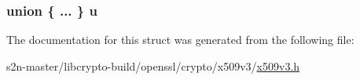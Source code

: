 \subsubsection[{\texorpdfstring{u}{u}}]{\setlength{\rightskip}{0pt plus 5cm}union \{ ... \}   u}\hypertarget{struct_a_s_id_or_range__st_a0f87daae8639568e823097ee78b6a9dc}{}\label{struct_a_s_id_or_range__st_a0f87daae8639568e823097ee78b6a9dc}


The documentation for this struct was generated from the following file\+:\begin{DoxyCompactItemize}
\item 
s2n-\/master/libcrypto-\/build/openssl/crypto/x509v3/\hyperlink{crypto_2x509v3_2x509v3_8h}{x509v3.\+h}\end{DoxyCompactItemize}
